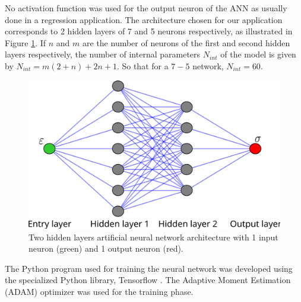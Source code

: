 \documentclass[metals,article,submit,pdftex,moreauthors]{Definitions/mdpi}
\begin{document}
No activation function was used for the output neuron of the ANN as usually done in a regression application.
The architecture chosen for our application corresponds to 2 hidden layers of 7 and 5 neurons respectively, as illustrated in Figure \ref{fig:ANN-7-5}.
If $n$ and $m$ are the number of neurons of the first and second hidden layers respectively, the number of internal parameters $N_{int}$ of the model is given by $N_{int}=m(2+n)+2n+1$.
So that for a $7-5$ network, $N_{int}=60$.
\begin{figure}[H]
\includegraphics[width=0.7\columnwidth]{Figures/ANN-7-5}
\caption{Two hidden layers artificial neural network architecture with 1 input neuron (green) and 1 output neuron (red).}
\label{fig:ANN-7-5}
\end{figure}
The Python program used for training the neural network was developed using the specialized Python library, Tensorflow \cite{Abadi-2016}.
The Adaptive Moment Estimation (ADAM) optimizer \cite{Kingma-2015} was used for the training phase.

\end{document}
